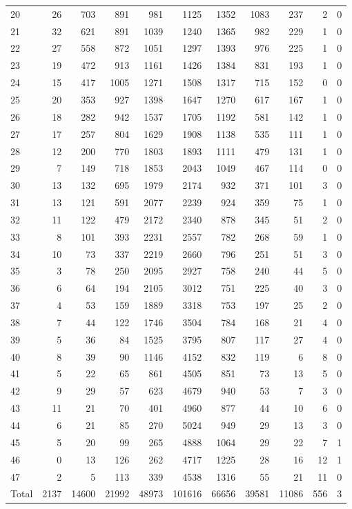 \begin{table}
\begin{tabular}{lrrrrrrrrrr}
20 & 26 & 703 & 891 & 981 & 1125 & 1352 & 1083 & 237 & 2 & 0 \\
21 & 32 & 621 & 891 & 1039 & 1240 & 1365 & 982 & 229 & 1 & 0 \\
22 & 27 & 558 & 872 & 1051 & 1297 & 1393 & 976 & 225 & 1 & 0 \\
23 & 19 & 472 & 913 & 1161 & 1426 & 1384 & 831 & 193 & 1 & 0 \\
24 & 15 & 417 & 1005 & 1271 & 1508 & 1317 & 715 & 152 & 0 & 0 \\
25 & 20 & 353 & 927 & 1398 & 1647 & 1270 & 617 & 167 & 1 & 0 \\
26 & 18 & 282 & 942 & 1537 & 1705 & 1192 & 581 & 142 & 1 & 0 \\
27 & 17 & 257 & 804 & 1629 & 1908 & 1138 & 535 & 111 & 1 & 0 \\
28 & 12 & 200 & 770 & 1803 & 1893 & 1111 & 479 & 131 & 1 & 0 \\
29 & 7 & 149 & 718 & 1853 & 2043 & 1049 & 467 & 114 & 0 & 0 \\
30 & 13 & 132 & 695 & 1979 & 2174 & 932 & 371 & 101 & 3 & 0 \\
31 & 13 & 121 & 591 & 2077 & 2239 & 924 & 359 & 75 & 1 & 0 \\
32 & 11 & 122 & 479 & 2172 & 2340 & 878 & 345 & 51 & 2 & 0 \\
33 & 8 & 101 & 393 & 2231 & 2557 & 782 & 268 & 59 & 1 & 0 \\
34 & 10 & 73 & 337 & 2219 & 2660 & 796 & 251 & 51 & 3 & 0 \\
35 & 3 & 78 & 250 & 2095 & 2927 & 758 & 240 & 44 & 5 & 0 \\
36 & 6 & 64 & 194 & 2105 & 3012 & 751 & 225 & 40 & 3 & 0 \\
37 & 4 & 53 & 159 & 1889 & 3318 & 753 & 197 & 25 & 2 & 0 \\
38 & 7 & 44 & 122 & 1746 & 3504 & 784 & 168 & 21 & 4 & 0 \\
39 & 5 & 36 & 84 & 1525 & 3795 & 807 & 117 & 27 & 4 & 0 \\
40 & 8 & 39 & 90 & 1146 & 4152 & 832 & 119 & 6 & 8 & 0 \\
41 & 5 & 22 & 65 & 861 & 4505 & 851 & 73 & 13 & 5 & 0 \\
42 & 9 & 29 & 57 & 623 & 4679 & 940 & 53 & 7 & 3 & 0 \\
43 & 11 & 21 & 70 & 401 & 4960 & 877 & 44 & 10 & 6 & 0 \\
44 & 6 & 21 & 85 & 270 & 5024 & 949 & 29 & 13 & 3 & 0 \\
45 & 5 & 20 & 99 & 265 & 4888 & 1064 & 29 & 22 & 7 & 1 \\
46 & 0 & 13 & 126 & 262 & 4717 & 1225 & 28 & 16 & 12 & 1 \\
47 & 2 & 5 & 113 & 339 & 4538 & 1316 & 55 & 21 & 11 & 0 \\
Total & 2137 & 14600 & 21992 & 48973 & 101616 & 66656 & 39581 & 11086 & 556 & 3 \\
\end{tabular}
\end{table}
